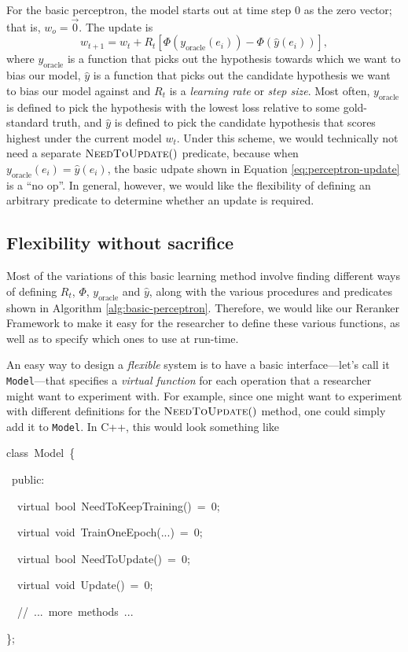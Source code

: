 \documentclass[a4paper]{article}
\newenvironment{lyxcode}
{\par\begin{list}{}{
\scriptsize
\setlength{\leftmargin}{0.1in}
\setlength{\rightmargin}{\leftmargin}
\setlength{\listparindent}{0pt}%
\raggedright
\setlength{\itemsep}{0pt}
\setlength{\parsep}{0pt}
\normalfont\ttfamily}%
 \item[]}
{\end{list}}
\begin{document}
For the basic perceptron, the model starts out at time step 0 as the
zero vector; that is, $w_{o}=\vec{0}.$ The update is 
\begin{equation}
w_{t+1}=w_{t}+R_{t}\left[\Phi\left(y_{\mathrm{oracle}}\left(e_{i}\right)\right)-\Phi\left(\hat{y}\left(e_{i}\right)\right)\right],\label{eq:perceptron-update}
\end{equation}
 where $y_{\mathrm{oracle}}$ is a function that picks out the hypothesis
towards which we want to bias our model, $\hat{y}$ is a function
that picks out the candidate hypothesis we want to bias our model
against and $R_{t}$ is a \emph{learning rate} or \emph{step size}.
Most often, $y_{\mathrm{oracle}}$ is defined to pick the hypothesis
with the lowest loss relative to some gold-standard truth, and $\hat{y}$
is defined to pick the candidate hypothesis that scores highest under
the current model $w_{t}$. Under this scheme, we would technically
not need a separate $ $$\Call{NeedToUpdate}{}()$ predicate, because
when $y_{\mathrm{oracle}}\left(e_{i}\right)=\hat{y}\left(e_{i}\right)$,
the basic udpate shown in Equation \ref{eq:perceptron-update} is
a ``no op''. In general, however, we would like the flexibility
of defining an arbitrary predicate to determine whether an update
is required.


\subsection{Flexibility without sacrifice}

Most of the variations of this basic learning method involve finding
different ways of defining $R_{t}$, $\Phi$, $y_{\mathrm{oracle}}$
and $\hat{y}$, along with the various procedures and predicates shown
in Algorithm \ref{alg:basic-perceptron}. Therefore, we would like
our Reranker Framework to make it easy for the researcher to define
these various functions, as well as to specify which ones to use at
run-time.

An easy way to design a \emph{flexible} system is to have a basic
interface---let's call it \texttt{Model}---that specifies a \emph{virtual
function} for each operation that a researcher might want to experiment
with. For example, since one might want to experiment with different
definitions for the $\Call{NeedToUpdate}{}()$ method, one could simply
add it to \texttt{Model}. In C++, this would look something like
\begin{lyxcode}
\scriptsize
class~Model~\{

~public:

~~virtual~bool~NeedToKeepTraining()~=~0;

~~virtual~void~TrainOneEpoch(...)~=~0;

~~virtual~bool~NeedToUpdate()~=~0;

~~virtual~void~Update()~=~0;

~~//~...~more~methods~...

\};
\end{lyxcode}
\normalsize
\end{document}
